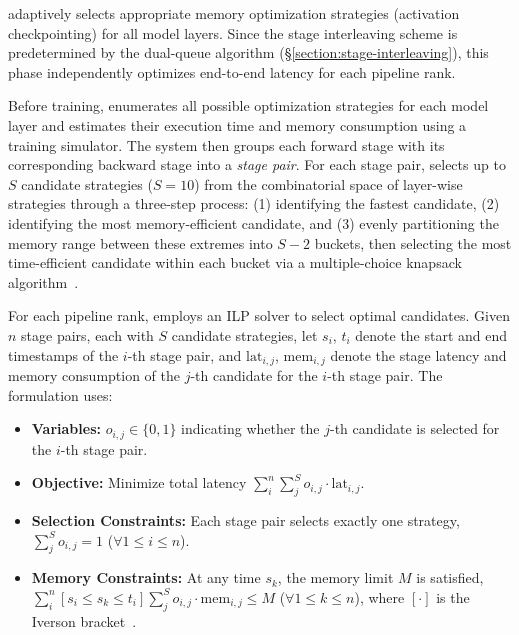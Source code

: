 \sys{} adaptively selects appropriate memory optimization strategies (\eg activation checkpointing)
for all model layers.
Since the stage interleaving scheme is predetermined by the dual-queue algorithm (\S\ref{section:stage-interleaving}),
this phase independently optimizes end-to-end latency for each pipeline rank.

Before training, \sys{} enumerates all possible optimization strategies for each model layer
and estimates their execution time and memory consumption using a training simulator.
The system then groups each forward stage with its corresponding backward stage into a \emph{stage pair}.
For each stage pair, \sys{} selects up to $S$ candidate strategies (\eg $S = 10$)
from the combinatorial space of layer-wise strategies through a three-step process:
(1) identifying the fastest candidate,
(2) identifying the most memory-efficient candidate, and
(3) evenly partitioning the memory range between these extremes into $S-2$ buckets,
then selecting the most time-efficient candidate within each bucket via a multiple-choice knapsack algorithm~\cite{multi-choice-knapsack}.

For each pipeline rank, \sys{} employs an ILP solver to select optimal candidates.
Given $n$ stage pairs, each with $S$ candidate strategies, let $s_i$, $t_i$ denote the start and end timestamps of the $i$-th stage pair,
and $\mathrm{lat}_{i,j}$, $\mathrm{mem}_{i,j}$ denote the stage latency and memory consumption of the $j$-th candidate for the $i$-th stage pair.
The formulation uses:

\begin{itemize}
    \item \textbf{Variables:} $o_{i,j} \in \{0,1\}$ indicating whether the $j$-th candidate is selected for the $i$-th stage pair.
    \item \textbf{Objective:} Minimize total latency $\sum_i^n \sum_j^S o_{i,j} \cdot \mathrm{lat}_{i,j}$.
    \item \textbf{Selection Constraints:} Each stage pair selects exactly one strategy, \ie $\sum_j^S o_{i,j} = 1$ ($\forall 1 \leq i \leq n$).
    \item \textbf{Memory Constraints: } At any time $s_k$, the memory limit $M$ is satisfied,
    \ie $\sum_i^n [s_i \leq s_k \leq t_i] \sum_j^S o_{i,j} \cdot \mathrm{mem}_{i,j} \leq M$ ($\forall 1 \leq k \leq n$),
    where $[\cdot]$ is the Iverson bracket~\cite{iverson-bracket}.
\end{itemize}

